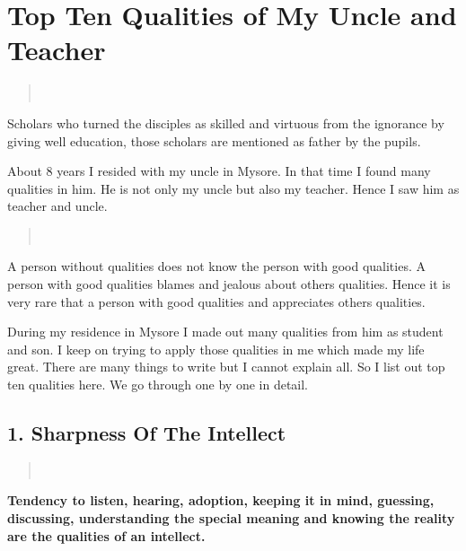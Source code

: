 \chapter{Top Ten Qualities of My Uncle and Teacher}

\begin{center}
\end{center}

\begin{verse}
\\
\end{verse}
Scholars who turned the disciples as skilled and virtuous from the ignorance by giving well education, those scholars are mentioned as father by the pupils.

About 8 years I resided with my uncle in Mysore. In that time I found many qualities in him. He is not only my uncle but also my teacher. Hence I saw him as teacher and uncle.
\begin{verse}
\\
\end{verse}
A person without qualities does not know the person with good qualities. A person with good qualities blames and jealous about others qualities. Hence it is very rare that a person with good qualities and appreciates others qualities.

During my residence in Mysore I made out many qualities from him as student and son. I keep on trying to apply those qualities in me which made my life great. There are many things to write but I cannot explain all. So I list out top ten qualities here. We go through one by one in detail.

\section*{1. Sharpness Of The Intellect }

\begin{verse}
\\
\end{verse}
\textbf{Tendency to listen, hearing, adoption, keeping it in mind, guessing, discussing, understanding the special meaning and knowing the reality are the qualities of an intellect.}

